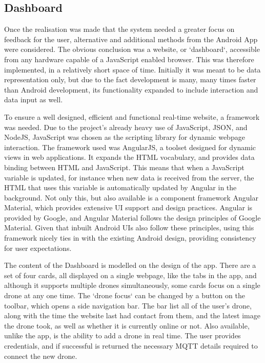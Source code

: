 \documentclass{article}
\begin{document}
\subsection{Dashboard} \label{Dashboard}
Once the realisation was made that the system needed a greater focus on feedback for the user, alternative and additional methods from the Android App were considered. The obvious conclusion was a website, or `dashboard`, accessible from any hardware capable of a JavaScript enabled browser. This was therefore implemented, in a relatively short space of time. Initially it was meant to be data representation only, but due to the fact development is many, many times faster than Android development, its functionality expanded to include interaction and data input as well. 

To ensure a well designed, efficient and functional real-time website, a framework was needed. Due to the project's already heavy use of JavaScript, JSON, and NodeJS, JavaScript was chosen as the scripting library for dynamic webpage interaction. The framework used was AngularJS, a toolset designed for dynamic views in web applications\cite{AngularJS}. It expands the HTML vocabulary, and provides data binding between HTML and JavaScript. This means that when a JavaScript variable is updated, for instance when new data is received from the server, the HTML that uses this variable is automatically updated by Angular in the background. Not only this, but also available is a component framework Angular Material\cite{AngularMaterial}, which provides extensive UI support and design practices. Angular is provided by Google, and Angular Material follows the design principles of Google Material\cite{GoogleMaterial}. Given that inbuilt Android UIs also follow these principles, using this framework nicely ties in with the existing Android design, providing consistency for user expectations. 

The content of the Dashboard is modelled on the design of the app. There are a set of four cards, all displayed on a single webpage, like the tabs in the app, and although it supports multiple drones simultaneously, some cards focus on a single drone at any one time. The `drone focus` can be changed by a button on the toolbar, which opens a side navigation bar. The bar list all of the user's drone, along with the time the website last had contact from them, and the latest image the drone took, as well as whether it is currently online or not. Also available, unlike the app, is the ability to add a drone in real time. The user provides credentials, and if successful is returned the necessary MQTT details required to connect the new drone.
\end{document}

